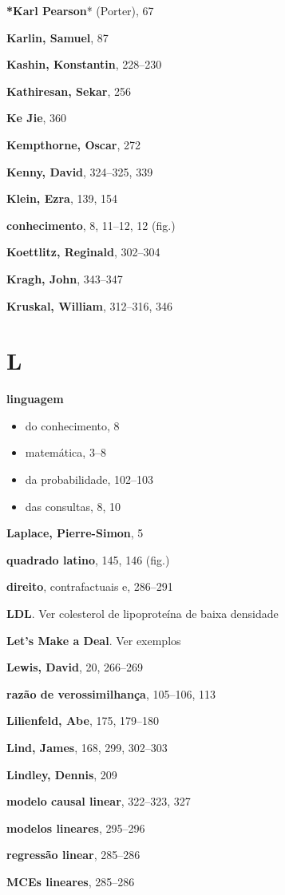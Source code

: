 \documentclass[11pt,a5paper,twoside]{book}
\begin{document}
\textbf{*Karl Pearson}* (Porter), 67

\textbf{Karlin, Samuel}, 87

\textbf{Kashin, Konstantin}, 228–230

\textbf{Kathiresan, Sekar}, 256

\textbf{Ke Jie}, 360

\textbf{Kempthorne, Oscar}, 272

\textbf{Kenny, David}, 324–325, 339

\textbf{Klein, Ezra}, 139, 154

\textbf{conhecimento}, 8, 11–12, 12 (fig.)

\textbf{Koettlitz, Reginald}, 302–304

\textbf{Kragh, John}, 343–347

\textbf{Kruskal, William}, 312–316, 346

\section{L}
\textbf{linguagem}

\begin{itemize}
\item do conhecimento, 8
\item matemática, 3–8
\item da probabilidade, 102–103
\item das consultas, 8, 10
\end{itemize}
\textbf{Laplace, Pierre-Simon}, 5

\textbf{quadrado latino}, 145, 146 (fig.)

\textbf{direito}, contrafactuais e, 286–291

\textbf{LDL}. Ver colesterol de lipoproteína de baixa densidade

\textbf{Let’s Make a Deal}. Ver exemplos

\textbf{Lewis, David}, 20, 266–269

\textbf{razão de verossimilhança}, 105–106, 113

\textbf{Lilienfeld, Abe}, 175, 179–180

\textbf{Lind, James}, 168, 299, 302–303

\textbf{Lindley, Dennis}, 209

\textbf{modelo causal linear}, 322–323, 327

\textbf{modelos lineares}, 295–296

\textbf{regressão linear}, 285–286

\textbf{MCEs lineares}, 285–286
\end{document}
